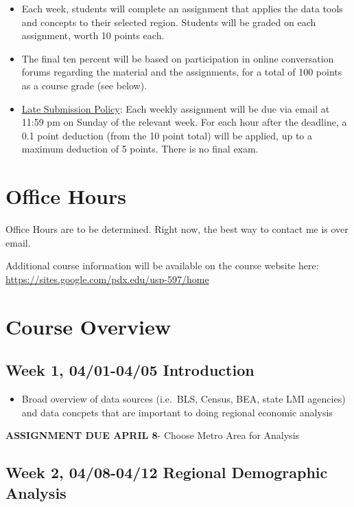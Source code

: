 \documentclass[11pt,]{article}
\providecommand{\tightlist}{%
  \setlength{\itemsep}{0pt}\setlength{\parskip}{0pt}}
\begin{document}
\begin{itemize}
\item
  Each week, students will complete an assignment that applies the data
  tools and concepts to their selected region. Students will be graded
  on each assignment, worth 10 points each.
\item
  The final ten percent will be based on participation in online
  conversation forums regarding the material and the assignments, for a
  total of 100 points as a course grade (see below).
\item
  \underline{Late Submission Policy}: Each weekly assignment will be due
  via email at 11:59 pm on Sunday of the relevant week. For each hour
  after the deadline, a 0.1 point deduction (from the 10 point total)
  will be applied, up to a maximum deduction of 5 points. There is no
  final exam.
\end{itemize}

\section{Office Hours}\label{office-hours}

Office Hours are to be determined. Right now, the best way to contact me
is over email.

Additional course information will be available on the course website
here: \url{https://sites.google.com/pdx.edu/usp-597/home}

\section{Course Overview}\label{course-overview}

\subsection{Week 1, 04/01-04/05
Introduction}\label{week-1-0401-0405-introduction}

\begin{itemize}
\tightlist
\item
  Broad overview of data sources (i.e.~BLS, Census, BEA, state LMI
  agencies) and data concpets that are important to doing regional
  economic analysis
\end{itemize}

\textbf{ASSIGNMENT DUE APRIL 8}- Choose Metro Area for Analysis

\subsection{Week 2, 04/08-04/12 Regional Demographic
Analysis}\label{week-2-0408-0412-regional-demographic-analysis}
\end{document}
